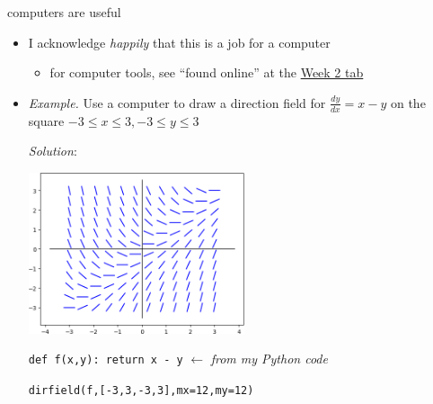 \documentclass{beamer}
\begin{document}
\begin{frame}{computers are useful}

\begin{itemize}
\item I acknowledge \emph{happily} that this is a job for a computer
    \begin{itemize}
    \item for computer tools,  see ``found online'' at the \href{https://bueler.github.io/math302/week2.html}{\color{cyan} Week 2 tab}
    \end{itemize}

\medskip
\item \emph{Example.}  Use a computer to draw a direction field for
$\frac{dy}{dx} = x-y$ on the square $-3 \le x \le 3, -3 \le y \le 3$

\bigskip
\emph{Solution}:

\vspace{-3mm}
\hfill \includegraphics[width=0.5\textwidth]{figs/example-field} \phantom{as dfjadl dsf}

\medskip
\scriptsize
\texttt{def f(x,y):  return x - y}  \hfill $\longleftarrow$ \emph{from my Python code}

\texttt{dirfield(f,[-3,3,-3,3],mx=12,my=12)}
\end{itemize}
\end{frame}
\end{document}
